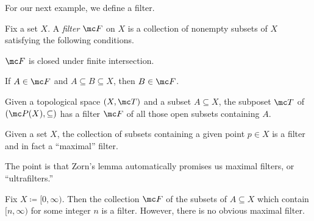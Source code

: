 \documentclass[../notes.tex]{subfiles}
\begin{document}
For our next example, we define a filter.
\begin{definition}[Filter]
	Fix a set $X$. A \textit{filter} $\mc F$ on $X$ is a collection of nonempty subsets of $X$ satisfying the following conditions.
	\begin{listalph}
		\item $\mc F$ is closed under finite intersection.
		\item If $A\in\mc F$ and $A\subseteq B\subseteq X$, then $B\in\mc F$.
	\end{listalph}
\end{definition}
\begin{example}
	Given a topological space $(X,\mc T)$ and a subset $A\subseteq X$, the subposet $\mc T$ of $(\mc P(X),\subseteq)$ has a filter $\mc F$ of all those open subsets containing $A$.
\end{example}
\begin{example}
	Given a set $X$, the collection of subsets containing a given point $p\in X$ is a filter and in fact a ``maximal'' filter.
\end{example}
The point is that Zorn's lemma automatically promises us maximal filters, or ``ultrafilters.''
\begin{example}
	Fix $X\coloneqq[0,\infty)$. Then the collection $\mc F$ of the subsets of $A\subseteq X$ which contain $[n,\infty)$ for some integer $n$ is a filter. However, there is no obvious maximal filter.
\end{example}
\end{document}
